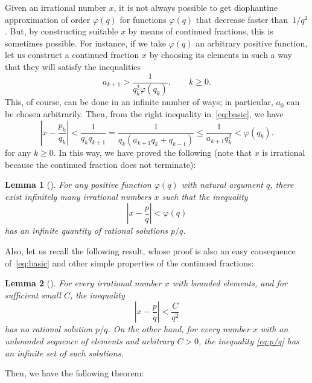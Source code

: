 \documentclass[11pt,a4paper,reqno]{amsart}
\theoremstyle{plain}
\newtheorem{lemma}{Lemma}
\theoremstyle{definition}
\begin{document}
Given an irrational number $x$, it is not always possible to get diophantine approximation of order $\varphi(q)$ for functions $\varphi(q)$ that decrease faster than~$1/q^2$. But, by constructing suitable $x$ by means of continued fractions, this is sometimes possible. For instance, if we take $\varphi(q)$ an arbitrary positive function, let us construct a continued fraction $x$ by choosing its elements in such a way that they will satisfy the inequalities
$$
  a_{k+1} > \frac{1}{q_k^2 \varphi(q_k)}, \qquad k \ge 0.
$$
This, of course, can be done in an infinite number of ways; in particular, $a_0$ can be chosen  arbitrarily. Then, from the right inequality in~\eqref{eq:basic}, we have
$$
  \left| x - \frac{p_k}{q_k} \right| < \frac{1}{q_kq_{k+1}}
  = \frac{1}{q_k(a_{k+1}q_k+q_{k-1})}
  \le \frac{1}{a_{k+1}q_k^2} < \varphi(q_k).
$$
for any $k \ge 0$.
In this way, we have proved the following (note that $x$ is irrational because the continued fraction does not terminate):

\begin{lemma}[{\cite[Theorem 22, page 35]{Khinchin}}]
\label{lem:varphi}
For any positive function $\varphi(q)$ with natural argument $q$, there exist infinitely many irrational numbers $x$ such that the inequality
\begin{equation}
\label{eq:phi}
  \left| x - \frac{p}{q} \right| < \varphi(q)
\end{equation}
has an infinite quantity of rational solutions $p/q$.
\end{lemma}

Also, let us recall the following result, whose proof is also an easy consequence of~\eqref{eq:basic} and other simple properties of the continued fractions:

\begin{lemma}[{\cite[Theorem 23, page 36]{Khinchin}}]
\label{lem:elements}
For every irrational number $x$ with bounded elements, and for sufficient small $C$, the inequality
\begin{equation}
\label{eq:p/q}
  \left| x - \frac{p}{q} \right| < \frac{C}{q^2}
\end{equation}
has no rational solution $p/q$. On the other hand, for every number $x$ with an unbounded sequence of elements and arbitrary $C > 0$, the inequality \eqref{eq:p/q} has an infinite set of such solutions.
\end{lemma}


Then, we have the following theorem:
\end{document}
